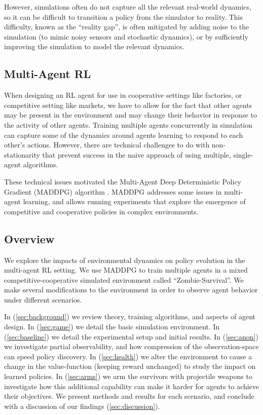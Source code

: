 \documentclass[11pt,a4paper]{article}
\begin{document}
However, simulations often do not capture all the relevant real-world dynamics, so it can be difficult to transition a policy from the simulator to reality.
This difficulty, known as the ``reality gap'', is often mitigated by adding noise \citep{jakobi1995noise} to the simulation (to mimic noisy sensors and stochastic dynamics),
or by sufficiently improving the simulation to model the relevant dynamics.

\subsection{Multi-Agent RL}

When designing an RL agent for use in cooperative settings like factories, or competitive setting like markets,
we have to allow for the fact that other agents may be present in the environment and may change their behavior in response to the activity of other agents.
Training multiple agents concurrently in simulation can capture some of the dynamics around agents learning to respond to each other's actions.
However, there are technical challenges to do with non-stationarity that prevent success in the naive approach of using multiple, single-agent algorithms.

These technical issues motivated the Multi-Agent Deep Deterministic Policy Gradient (MADDPG) algorithm \citep{lowe2020multiagent}.
MADDPG addresses some issues in multi-agent learning, and allows running experiments that explore the emergence of competitive and cooperative policies in complex environments.

\subsection{Overview}

We explore the impacts of environmental dynamics on policy evolution 
in the multi-agent RL setting.
We use MADDPG to train multiple agents in a mixed competitive-cooperative simulated environment called ``Zombie-Survival''.
We make several modifications to the environment in order to observe agent behavior under different scenarios.

In (\ref{sec:background}) we review theory, training algorithms, and aspects of agent design.
In (\ref{sec:game}) we detail the basic simulation environment.
In (\ref{sec:baseline}) we detail the experimental setup and initial results.
In (\ref{sec:anon}) we investigate partial observability, and how compression of the observation-space can speed policy discovery.
In (\ref{sec:health}) we alter the environment to cause a change in the value-function (keeping reward unchanged) to study the impact on learned policies.
In (\ref{sec:arms}) we arm the survivors with projectile weapons to investigate how this additional capability can make it harder for agents to achieve their objectives.
We present methods and results for each scenario, and conclude with a discussion of our findings (\ref{sec:discussion}).
\end{document}
